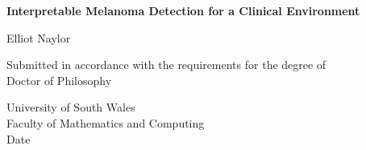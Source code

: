 \begin{titlepage}
    \begin{center}
        \vspace*{1cm}
        
        \Large{\textbf{Interpretable Melanoma Detection for a Clinical Environment}}
        
        \vspace{2cm}
        \normalsize
        Elliot Naylor
        \vfill
        
       Submitted in accordance with the requirements for the degree of \\
       Doctor of Philosophy
        
        \vspace{0.8cm}
        
        University of South Wales\\
        Faculty of Mathematics and Computing\\
     \hfill\break
        Date
        
    \end{center}
\end{titlepage}
